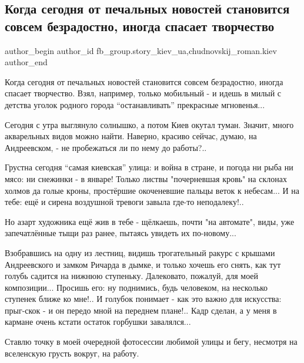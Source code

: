  
 
 
 
 

\subsection{Когда сегодня от печальных новостей становится совсем безрадостно, иногда спасает творчество}
\label{sec:19_01_2023.fb.fb_group.story_kiev_ua.1.kogda_segodnya_ot_pe}
 
\ifcmt
 author_begin
   author_id fb_group.story_kiev_ua,chudnovskij_roman.kiev
 author_end
\fi

Когда сегодня от печальных новостей становится совсем безрадостно, иногда
спасает творчество. Взял, например, только мобильный - и идешь в милый с
детства уголок родного города \enquote{останавливать} прекрасные мгновенья... 

Сегодня с утра выглянуло солнышко, а потом Киев окутал туман. Значит, много
акварельных видов можно найти. Наверно, красиво сейчас, думаю, на Андреевском,
- не пробежаться ли по нему до работы?..

Грустна сегодня \enquote{самая киевская} улица: и война в стране, и погода ни
рыба ни мясо: ни снежинки - в январе! Только листвы "почерневшая кровь" на
склонах холмов да голые кроны, простёршие окоченевшие пальцы веток к небесам...
И на тебе: ещё и сирена воздушной тревоги завыла где-то неподалеку!..

Но азарт художника ещё жив в тебе - щёлкаешь, почти "на автомате", виды, уже
запечатлённые тыщи раз ранее, пытаясь увидеть их по-новому... 

Взобравшись на одну из  лестниц, видишь трогательный ракурс с крышами
Андреевского и замком Ричарда в дымке, и только хочешь его снять, как тут
голубь садится на нижнюю ступеньку. Далековато, пожалуй, для моей композиции...
Просишь его: ну поднимись, будь человеком, на несколько ступенек ближе ко
мне!.. И голубок понимает - как это важно для искусства: прыг-скок - и он
передо мной на переднем плане!.. Кадр сделан, а у меня в кармане  очень кстати
остаток горбушки завалялся... 

Ставлю точку в моей очередной фотосессии любимой улицы и бегу, несмотря на
вселенскую грусть вокруг, на работу.
